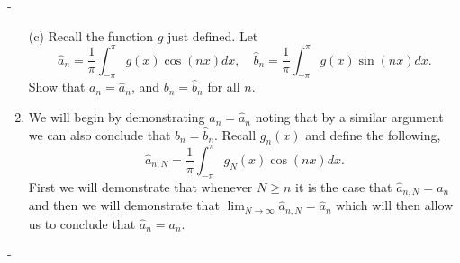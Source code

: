 \documentclass[12pt]{article}
\makeatletter
\theoremstyle{ex215}
\newcounter{probcount}
\newlength\probsep
\newlength\pshrinking
\newenvironment{problems}%
  {\ifhmode\unskip\par\fi\setcounter{probcount}{0}\probsep\parskip
  \sbox\@tempboxa{\textbf{9.}}\pshrinking\wd\@tempboxa\advance\pshrinking\labelsep
  \advance\linewidth -\pshrinking
  \advance\@totalleftmargin\pshrinking
  \advance\leftskip\pshrinking}%
  {\ifhmode\unskip \par\fi\advance\leftskip-\pshrinking}%
\renewenvironment{proof}[1][\proofname]{\par
  \pushQED{\qed}%
  \normalfont \topsep6\p@\@plus6\p@\relax
  \trivlist
  \@topsep \topsep
  \item[\hskip\labelsep
        \itshape
    #1\@addpunct{.}]\ignorespaces
}{%
  \popQED\endtrivlist\@endpefalse
}
\makeatother
\begin{document}
\begin{problems}
\begin{enumerate}
  \item[(c)] Recall the function $g$ just defined. Let 
  \begin{equation*}
    \hat{a}_n = \frac{1}{\pi}\int_{-\pi}^{\pi} g(x) \cos(nx) dx, \quad \hat{b}_n = \frac{1}{\pi}\int_{-\pi}^{\pi} g(x) \sin(nx) dx.
  \end{equation*}
  Show that $a_n = \hat{a}_n$, and $b_n = \hat{b}_n$ for all $n$. 
  \begin{proof} We will begin by demonstrating $a_n = \hat{a}_n$ noting that by a similar argument we can also conclude that $b_n = \hat{b}_n$. Recall $g_n(x)$ and define the following, 
    \begin{equation*}
      \hat{a}_{n, N} = \frac{1}{\pi}\int_{-\pi}^{\pi} g_N(x) \cos(nx) dx.
    \end{equation*} 
    First we will demonstrate that whenever $N \geq n$ it is the case that $\hat{a}_{n, N} = a_n$ and then we will demonstrate that $\lim_{N \to \infty} \hat{a}_{n, N} = \hat{a}_n$ which will then allow us to conclude that $\hat{a}_n = a_n$.
    

\end{proof}
\end{enumerate}
\end{problems}
\end{document}
